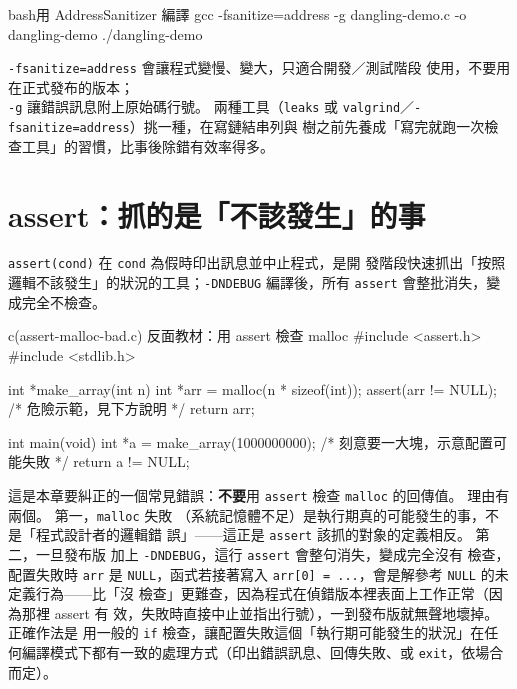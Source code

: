 \begin{code}{bash}{用 AddressSanitizer 編譯}
gcc -fsanitize=address -g dangling-demo.c -o dangling-demo
./dangling-demo
\end{code}

\texttt{-fsanitize=address} 會讓程式變慢、變大，只適合開發／測試階段
使用，不要用在正式發布的版本；\\
\texttt{-g} 讓錯誤訊息附上原始碼行號。 兩種工具（\texttt{leaks} 或
\texttt{valgrind}／\texttt{-fsanitize=address}）挑一種，在寫鏈結串列與
樹之前先養成「寫完就跑一次檢查工具」的習慣，比事後除錯有效率得多。


\section{assert：抓的是「不該發生」的事}
\label{sec:ds-assert}

\texttt{assert(cond)} 在 \texttt{cond} 為假時印出訊息並中止程式，是開
發階段快速抓出「按照邏輯不該發生」的狀況的工具；\texttt{-DNDEBUG}
編譯後，所有 \texttt{assert} 會整批消失，變成完全不檢查。

\begin{example}{c}{(assert-malloc-bad.c) 反面教材：用 assert 檢查 malloc}
#include <assert.h>
#include <stdlib.h>

int *make_array(int n) {
    int *arr = malloc(n * sizeof(int));
    assert(arr != NULL); /* 危險示範，見下方說明 */
    return arr;
}

int main(void) {
    int *a = make_array(1000000000); /* 刻意要一大塊，示意配置可能失敗 */
    return a != NULL;
}
\end{example}

這是本章要糾正的一個常見錯誤：\textbf{不要}用 \texttt{assert} 檢查
\texttt{malloc} 的回傳值。 理由有兩個。 第一，\texttt{malloc} 失敗
（系統記憶體不足）是執行期真的可能發生的事，不是「程式設計者的邏輯錯
誤」——這正是 \texttt{assert} 該抓的對象的定義相反。 第二，一旦發布版
加上 \texttt{-DNDEBUG}，這行 \texttt{assert} 會整句消失，變成完全沒有
檢查，配置失敗時 \texttt{arr} 是 \texttt{NULL}，函式若接著寫入
\texttt{arr[0] = ...}，會是解參考 \texttt{NULL} 的未定義行為——比「沒
檢查」更難查，因為程式在偵錯版本裡表面上工作正常（因為那裡 assert 有
效，失敗時直接中止並指出行號），一到發布版就無聲地壞掉。 正確作法是
用一般的 \texttt{if} 檢查，讓配置失敗這個「執行期可能發生的狀況」在任
何編譯模式下都有一致的處理方式（印出錯誤訊息、回傳失敗、或
\texttt{exit}，依場合而定）。

